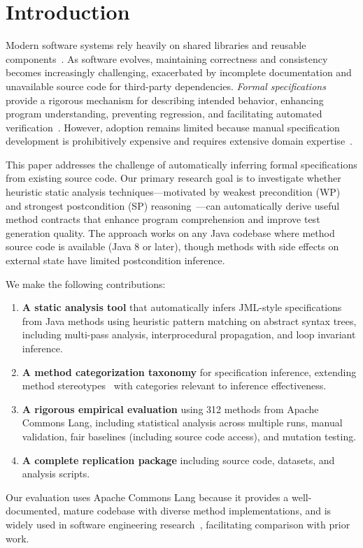 \section{Introduction}
\label{sec:introduction}

Modern software systems rely heavily on shared libraries and reusable components~\cite{de_toledo_improving_2020}. As software evolves, maintaining correctness and consistency becomes increasingly challenging, exacerbated by incomplete documentation and unavailable source code for third-party dependencies. \emph{Formal specifications} provide a rigorous mechanism for describing intended behavior, enhancing program understanding, preventing regression, and facilitating automated verification~\cite{hasan_formal_2015, dsilva_survey_2008, woodcock2009formal}. However, adoption remains limited because manual specification development is prohibitively expensive and requires extensive domain expertise~\cite{matichuk_cost_2015, hall1990seven}.

This paper addresses the challenge of automatically inferring formal specifications from existing source code. Our primary research goal is to investigate whether heuristic static analysis techniques---motivated by weakest precondition (WP) and strongest postcondition (SP) reasoning~\cite{dijkstra1976discipline, hoare1969axiomatic}---can automatically derive useful method contracts that enhance program comprehension and improve test generation quality. The approach works on any Java codebase where method source code is available (Java 8 or later), though methods with side effects on external state have limited postcondition inference.

We make the following contributions:

\begin{enumerate}
    \item \textbf{A static analysis tool} that automatically infers JML-style specifications from Java methods using heuristic pattern matching on abstract syntax trees, including multi-pass analysis, interprocedural propagation, and loop invariant inference.

    \item \textbf{A method categorization taxonomy} for specification inference, extending method stereotypes~\cite{dragan2006reverse} with categories relevant to inference effectiveness.

    \item \textbf{A rigorous empirical evaluation} using 312 methods from Apache Commons Lang, including statistical analysis across multiple runs, manual validation, fair baselines (including source code access), and mutation testing.

    \item \textbf{A complete replication package} including source code, datasets, and analysis scripts.
\end{enumerate}

Our evaluation uses Apache Commons Lang because it provides a well-documented, mature codebase with diverse method implementations, and is widely used in software engineering research~\cite{pacheco2007randoop, fraser2011evosuite}, facilitating comparison with prior work.
